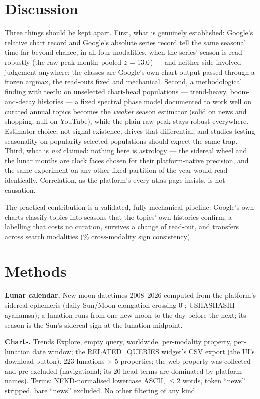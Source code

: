 \documentclass[11pt]{artaquest}
\begin{document}
\section{Discussion}
Three things should be kept apart. First, what is genuinely established: Google's relative chart record and Google's absolute series record tell the same seasonal time far beyond chance, in all four modalities, when the series' season is read robustly (the raw peak month; pooled $z = 13.0$) --- and neither side involved judgement anywhere: the classes are Google's own chart output passed through a frozen argmax, the read-outs fixed and mechanical. Second, a methodological finding with teeth: on unselected chart-head populations --- trend-heavy, boom-and-decay histories --- a fixed spectral phase model documented to work well on curated annual topics becomes the \emph{weaker} season estimator (solid on news and shopping, null on YouTube), while the plain raw peak stays robust everywhere. Estimator choice, not signal existence, drives that differential, and studies testing seasonality on popularity-selected populations should expect the same trap. Third, what is \emph{not} claimed: nothing here is astrology --- the sidereal wheel and the lunar months are clock faces chosen for their platform-native precision, and the same experiment on any other fixed partition of the year would read identically. Correlation, as the platform's every atlas page insists, is not causation.

The practical contribution is a validated, fully mechanical pipeline: Google's own charts classify topics into seasons that the topics' own histories confirm, a labelling that costs no curation, survives a change of read-out, and transfers across search modalities (\xSame\% cross-modality sign consistency).

\section{Methods}
\textbf{Lunar calendar.} New-moon datetimes 2008--2026 computed from the platform's sidereal ephemeris (daily Sun/Moon elongation crossing $0^\circ$; USHASHASHI ayanamsa); a lunation runs from one new moon to the day before the next; its season is the Sun's sidereal sign at the lunation midpoint.

\textbf{Charts.} Trends Explore, empty query, worldwide, per-modality property, per-lunation date window; the RELATED\_QUERIES widget's CSV export (the UI's download button). 223 lunations $\times$ 5 properties; the web property was collected and pre-excluded (navigational; its 20 head terms are dominated by platform names). Terms: NFKD-normalised lowercase ASCII, $\le$2 words, token ``news'' stripped, bare ``news'' excluded. No other filtering of any kind.
\end{document}
